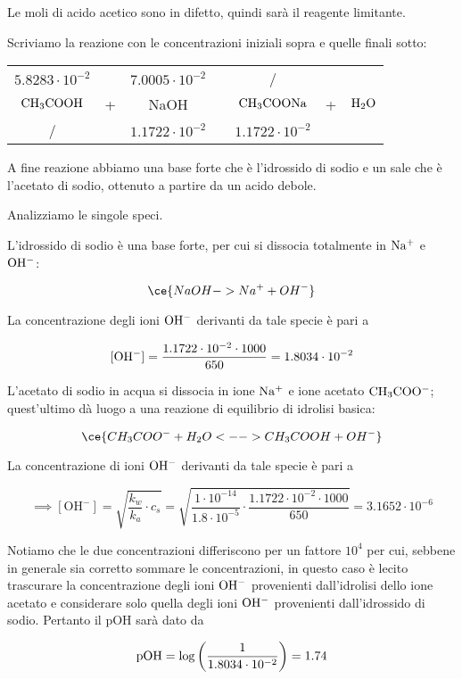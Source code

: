 Le moli di acido acetico sono in difetto, quindi sarà il reagente limitante.

Scriviamo la reazione con le concentrazioni iniziali sopra e quelle finali sotto:

\begin{center}
    \begin{tabular}{ccccccc}
        $5.8283 \cdot 10^{-2}$ &  & $7.0005 \cdot 10^{-2}$ & & / &&\\
        $\rm CH_3COOH$ & + & NaOH & \ce{->} & $\rm CH_3COONa$ & + & $\rm H_2O$\\
        / & & $1.1722 \cdot 10^{-2}$ & & $1.1722 \cdot 10^{-2}$&&\\
    \end{tabular}
\end{center}

A fine reazione abbiamo una base forte che è l'idrossido di sodio e un sale che è l'acetato di sodio, ottenuto a partire da un acido debole.

Analizziamo le singole speci.

L'idrossido di sodio è una base forte, per cui si dissocia totalmente in $\rm Na^+$ e $\rm OH^-$:

$$\ce{NaOH -> Na^+ + OH^-}$$

La concentrazione degli ioni $\rm OH^-$ derivanti da tale specie è pari a

$$[\rm OH^-]=\frac{1.1722 \cdot 10^{-2} \cdot 1000}{650}=1.8034 \cdot 10^{-2}$$

L'acetato di sodio in acqua si dissocia in ione $\rm Na^+$ e ione acetato $\rm CH_3COO^-$; quest'ultimo dà luogo a una reazione di equilibrio di idrolisi basica:

$$\ce{CH_3COO^- + H_2O <--> CH_3COOH + OH^-}$$

La concentrazione di ioni $\rm OH^-$ derivanti da tale specie è pari a

$$\implies [\text{OH}^-]=\sqrt{\frac{k_w}{k_a} \cdot c_s}=\sqrt{\frac{1 \cdot 10^{-14}}{1.8 \cdot 10^{-5}} \cdot \frac{1.1722 \cdot 10^{-2} \cdot 1000}{650}}=3.1652 \cdot 10^{-6}$$

Notiamo che le due concentrazioni differiscono per un fattore $10^4$ per cui, sebbene in generale sia corretto sommare le concentrazioni, in questo caso è lecito trascurare la concentrazione degli ioni $\rm OH^-$ provenienti dall'idrolisi dello ione acetato e considerare solo quella degli ioni $\rm OH^-$ provenienti dall'idrossido di sodio. Pertanto il pOH sarà dato da

$$\rm pOH=\log{\left(\frac{1}{1.8034 \cdot 10^{-2}}\right)}=1.74$$

